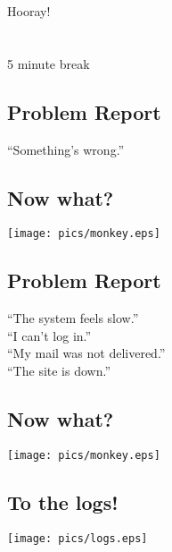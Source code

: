 \documentclass[xga]{xdvislides}
\begin{document}
\newpage
\vspace*{\fill}
\begin{center}
	\Hugesize
		Hooray!\\ [1em]
	\hspace*{5mm}
	\blueline\\
	\hspace*{5mm}\\
		5 minute break
\end{center}
\vspace*{\fill}


\subsection{Problem Report}
\vspace*{\fill}
\Huge
\begin{center}
``Something's wrong.''
\end{center}
\Normalsize
\vspace*{\fill}

\subsection{Now what?}
\begin{center}
	\texttt{[image: pics/monkey.eps]}
\end{center}

\subsection{Problem Report}
\vspace*{\fill}
\Huge
\begin{center}
``The system feels slow.'' \\
\addvspace{.5in}
``I can't log in.'' \\
\addvspace{.5in}
``My mail was not delivered.'' \\
\addvspace{.5in}
``The site is down.''
\end{center}
\Normalsize
\vspace*{\fill}

\subsection{Now what?}
\begin{center}
	\texttt{[image: pics/monkey.eps]}
\end{center}

\subsection{To the logs!}
\begin{center}
	\texttt{[image: pics/logs.eps]}
\end{center}
\end{document}
